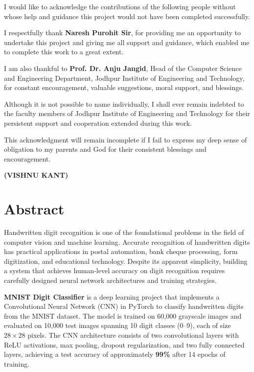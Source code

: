 \documentclass[12pt,a4paper,openany]{report}
\begin{document}
I would like to acknowledge the contributions of the following people without whose help and guidance this project would not have been completed successfully.

I respectfully thank \textbf{Naresh Purohit Sir}, for providing me an opportunity to undertake this project and giving me all support and guidance, which enabled me to complete this work to a great extent.

I am also thankful to \textbf{Prof. Dr. Anju Jangid}, Head of the Computer Science and Engineering Department, Jodhpur Institute of Engineering and Technology, for constant encouragement, valuable suggestions, moral support, and blessings.

Although it is not possible to name individually, I shall ever remain indebted to the faculty members of Jodhpur Institute of Engineering and Technology for their persistent support and cooperation extended during this work.

This acknowledgment will remain incomplete if I fail to express my deep sense of obligation to my parents and God for their consistent blessings and encouragement.

\vspace{2cm}
\hfill \textbf{(VISHNU KANT)}

\newpage

\chapter*{Abstract}

Handwritten digit recognition is one of the foundational problems in the field of computer vision and machine learning. Accurate recognition of handwritten digits has practical applications in postal automation, bank cheque processing, form digitization, and educational technology. Despite its apparent simplicity, building a system that achieves human-level accuracy on digit recognition requires carefully designed neural network architectures and training strategies.

\textbf{MNIST Digit Classifier} is a deep learning project that implements a Convolutional Neural Network (CNN) in PyTorch to classify handwritten digits from the MNIST dataset. The model is trained on 60,000 grayscale images and evaluated on 10,000 test images spanning 10 digit classes (0--9), each of size $28 \times 28$ pixels. The CNN architecture consists of two convolutional layers with ReLU activations, max pooling, dropout regularization, and two fully connected layers, achieving a test accuracy of approximately \textbf{99\%} after 14 epochs of training.
\end{document}

